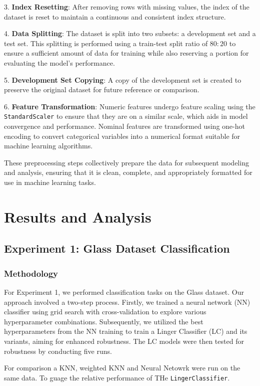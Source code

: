 \documentclass[a4paper, 12pt]{report}
\begin{document}
3. \textbf{Index Resetting}: After removing rows with missing values, the index of the dataset is reset to maintain a continuous and consistent index structure.

4. \textbf{Data Splitting}: The dataset is split into two subsets: a development set and a test set. 
This splitting is performed using a train-test split ratio of $80:20$ to ensure a sufficient amount of data for training while also reserving a portion for evaluating the model's performance.

5. \textbf{Development Set Copying}: A copy of the development set is created to preserve the original dataset for future reference or comparison.

6. \textbf{Feature Transformation}: Numeric features undergo feature scaling using the \texttt{StandardScaler} to ensure that they are on a similar scale, 
which aids in model convergence and performance. Nominal features are transformed using one-hot encoding to convert categorical variables into a numerical format 
suitable for machine learning algorithms.

These preprocessing steps collectively prepare the data for subsequent modeling and analysis, ensuring that it is clean, complete, and 
appropriately formatted for use in machine learning tasks.

\section{Results and Analysis}

\subsection{Experiment 1: Glass Dataset Classification}

\subsubsection{Methodology}
For Experiment 1, we performed classification tasks on the Glass dataset. Our approach involved a two-step process. 
Firstly, we trained a neural network (NN) classifier using grid search with cross-validation to explore various hyperparameter combinations. 
Subsequently, we utilized the best hyperparameters from the NN training to train a Linger Classifier (LC) and its variants, aiming for enhanced robustness. 
The LC models were then tested for robustness by conducting five runs.

For comparison a KNN, weighted KNN and Neural Netowrk were run on the same data. To guage the relative performance of THe \texttt{LingerClassifier}.
\end{document}
